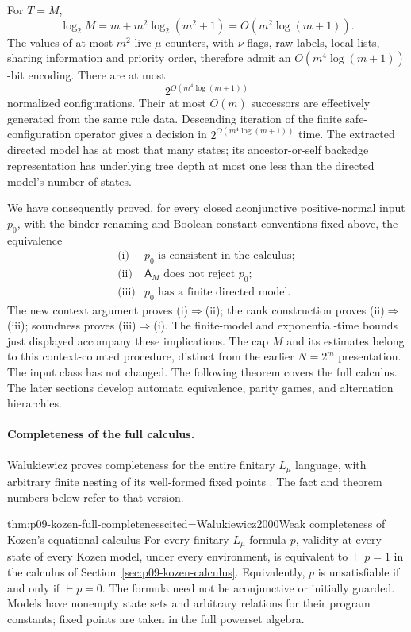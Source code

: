 For \(T=M\),
\[
 \log_2 M=m+m^2\log_2(m^2+1)
          =O(m^2\log(m+1)).
\]
The values of at most \(m^2\) live
\(\mu\)-counters, with \(\nu\)-flags,
raw labels, local lists,
sharing information and priority
order, therefore admit an
\(O(m^4\log(m+1))\)-bit encoding.
There are at most
\[
 2^{O(m^4\log(m+1))}
\]
normalized configurations.
Their at most \(O(m)\) successors
are effectively generated from
the same rule data.
Descending iteration of the finite
safe-configuration operator gives
a decision in
\(2^{O(m^4\log(m+1))}\) time.
The extracted directed model has
at most that many states; its
ancestor-or-self backedge
representation has underlying
tree depth at most one less
than the directed model's number of states.

We have consequently proved, for
every closed aconjunctive positive-normal
input \(p_0\), with the binder-renaming
and Boolean-constant conventions fixed
above, the equivalence
\[
\begin{array}{ll}
 \text{(i)}&p_0\text{ is consistent in the calculus};\\
 \text{(ii)}&\mathsf A_M\text{ does not reject }p_0;\\
 \text{(iii)}&p_0\text{ has a finite directed model}.
\end{array}
\]
The new context argument proves
(i)\(\Rightarrow\)(ii); the
rank construction proves
(ii)\(\Rightarrow\)(iii);
soundness proves
(iii)\(\Rightarrow\)(i).
The finite-model and exponential-time
bounds just displayed accompany
these implications.
The cap \(M\) and its estimates
belong to this context-counted
procedure, distinct from the
earlier \(N=2^m\) presentation.
The input class has not changed.
The following theorem covers the
full calculus.  The later sections
develop automata equivalence, parity
games, and alternation hierarchies.

\paragraph{Completeness of the full calculus.}
\label{sec:p09-kozen-full-completeness}
Walukiewicz proves completeness for the entire finitary
\(L_\mu\) language, with arbitrary finite nesting of its well-formed
fixed points \cite[\S6, Theorem~25 of the author version]{Walukiewicz2000}.
The fact and theorem numbers below refer to that version.

\begin{hbtheorem}{thm:p09-kozen-full-completeness}{cited=Walukiewicz2000}{Weak completeness of Kozen's equational calculus}
For every finitary \(L_\mu\)-formula \(p\), validity at every state of
every Kozen model, under every environment, is equivalent to
\(\vdash p=1\) in the calculus of
Section~\ref{sec:p09-kozen-calculus}.
Equivalently, \(p\) is unsatisfiable if and only if
\(\vdash p=0\).
The formula need not be aconjunctive or initially guarded.
Models have nonempty state sets and arbitrary relations for their
program constants; fixed points are taken in the full powerset algebra.
\end{hbtheorem}

